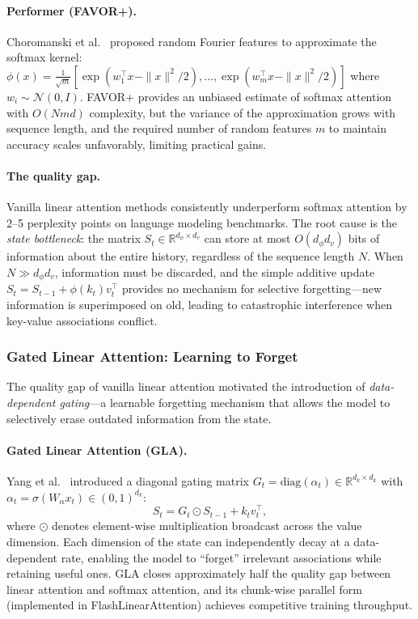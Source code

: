 \documentclass[11pt,a4paper]{article}
\begin{document}
\paragraph{Performer (FAVOR+).}
Choromanski et al.~\cite{choromanski2021rethinking} proposed random Fourier features to approximate the softmax kernel: $\phi(x) = \frac{1}{\sqrt{m}} [\exp(w_1^\top x - \|x\|^2/2), \ldots, \exp(w_m^\top x - \|x\|^2/2)]$ where $w_i \sim \mathcal{N}(0, I)$. FAVOR+ provides an unbiased estimate of softmax attention with $O(Nmd)$ complexity, but the variance of the approximation grows with sequence length, and the required number of random features $m$ to maintain accuracy scales unfavorably, limiting practical gains.

\paragraph{The quality gap.}
Vanilla linear attention methods consistently underperform softmax attention by 2--5 perplexity points on language modeling benchmarks. The root cause is the \emph{state bottleneck}: the matrix $S_t \in \mathbb{R}^{d_\phi \times d_v}$ can store at most $O(d_\phi d_v)$ bits of information about the entire history, regardless of the sequence length $N$. When $N \gg d_\phi d_v$, information must be discarded, and the simple additive update $S_t = S_{t-1} + \phi(k_t) v_t^\top$ provides no mechanism for selective forgetting---new information is superimposed on old, leading to catastrophic interference when key-value associations conflict.

\subsubsection{Gated Linear Attention: Learning to Forget}

The quality gap of vanilla linear attention motivated the introduction of \emph{data-dependent gating}---a learnable forgetting mechanism that allows the model to selectively erase outdated information from the state.

\paragraph{Gated Linear Attention (GLA).}
Yang et al.~\cite{yang2024gla} introduced a diagonal gating matrix $G_t = \text{diag}(\alpha_t) \in \mathbb{R}^{d_k \times d_k}$ with $\alpha_t = \sigma(W_\alpha x_t) \in (0, 1)^{d_k}$:
\begin{equation}
S_t = G_t \odot S_{t-1} + k_t v_t^\top,
\label{eq:gla}
\end{equation}
where $\odot$ denotes element-wise multiplication broadcast across the value dimension. Each dimension of the state can independently decay at a data-dependent rate, enabling the model to ``forget'' irrelevant associations while retaining useful ones. GLA closes approximately half the quality gap between linear attention and softmax attention, and its chunk-wise parallel form (implemented in FlashLinearAttention) achieves competitive training throughput.
\end{document}
